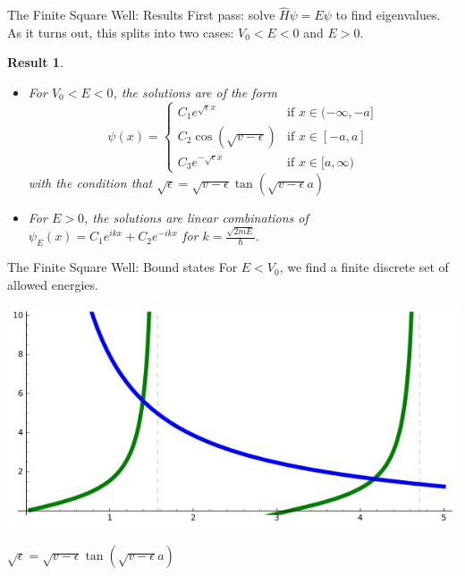 \documentclass{beamer}
\newtheorem{result}{Result}
\begin{document}
\begin{frame}{The Finite Square Well: Results}
    First pass: solve $\hat{H}\psi = E\psi$ to find eigenvalues.
    As it turns out, this splits into two cases: $V_0<E<0$ and $E>0$.
    \begin{result}
        \begin{itemize}
            \item For $V_0<E<0$, the solutions are of the form
    \[
    \psi(x) =
    \begin{cases}
        C_1e^{\sqrt{\epsilon}x}& \text{if } x\in(-\infty,-a]\\
        C_2\cos(\sqrt{v-\epsilon})& \text{if } x\in[-a,a]\\
        C_3e^{-\sqrt{\epsilon}x}& \text{if } x\in [a, \infty)
    \end{cases}
    \]
                with the condition that $
    \sqrt{\epsilon} = \sqrt{v-\epsilon}\tan(\sqrt{v-\epsilon}a)$

            \item For $E>0$, the solutions are linear combinations of
                $\psi_E(x) = C_1e^{ikx} + C_2e^{-ikx}$ for
                $k=\frac{\sqrt{2mE}}{\hbar}$.
        \end{itemize}
    \end{result}
\end{frame}

\begin{frame}{The Finite Square Well: Bound states}
    For $E<V_0$, we find a finite discrete set of allowed energies.
    \begin{center}
    \includegraphics[scale=0.4]{transcendental_solutions}
    \end{center}
    $\sqrt{\epsilon} = \sqrt{v-\epsilon}\tan(\sqrt{v-\epsilon}a)$
\end{frame}
\end{document}
